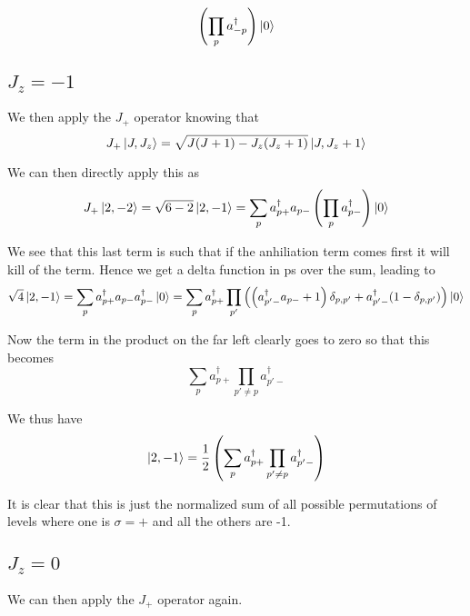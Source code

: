 \documentclass[11pt]{article} %
\begin{document}
\begin{equation} \left(\prod  _p a_{-p}^\dagger\right) \ket{ 0}\end{equation}
\subsection{$J_z=-1$}
We then apply the $J_+$ operator knowing that\\

\begin{equation}
J_+ \ket{J,J_z}=\sqrt{J(J+1)-J_z(J_z+1)}\ket{J,J_z+1}\end{equation}

We can then directly apply this as\\

\begin{equation} 
J_+ \ket{2,-2}=\sqrt{6-2}\ket{2,-1}=\sum_p a_{p+}^\dagger a_{p-}\left(\prod_p a_{p-}^\dagger\right) \ket{ 0} \end{equation}


We see that this last term is such that if the anhiliation term comes first it will kill of the term. Hence we get a delta function in ps over the sum, leading to\\

\begin{equation}
\sqrt{4}\ket{2,-1}=\sum_p a_{p+}^\dagger a_{p-} a_{p-}^\dagger \ket{ 0} =\sum_p a_{p+}^\dagger \prod_{p'} \left(\left( a_{p'-}^\dagger a_{p-}+1\right)\delta_{p,p'}+a_{p'-}^\dagger(1-\delta_{p,p'}) \right)  \ket{ 0} \end{equation}

Now the term in the product on the far left clearly goes to zero so that this becomes\\

\begin{equation}
\sum_p a_{p+}^\dagger \prod_{p' \neq p} a_{p'-}^\dagger
\end{equation}

We thus have\\
\begin{equation}
\ket{2,-1}=\frac{1}{2} \left(\sum_p a_{p+}^\dagger \prod_{p' \neq p} a_{p'-}^\dagger\right)\end{equation}


It is clear that this is just the normalized sum of all possible permutations of levels where one is $\sigma=+$ and all the others are -1.


\subsection{$J_z=0$}
We can then apply the $J_+$ operator again.\\
\end{document}
